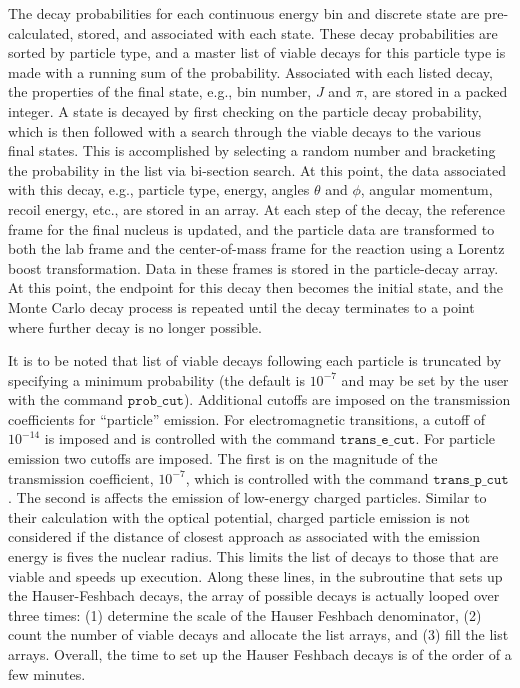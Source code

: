 \documentclass[
10pt,
showpacs,preprintnumbers,footinbib,
amsfonts,amsmath,amssymb,
aps,
prc,twocolumn,groupedaddress,superscriptaddress,
showkeys,
nofootinbib
]{revtex4-1}
\begin{document}
The decay probabilities for each continuous energy bin and discrete state are pre-calculated, stored, and associated with each state. These decay probabilities are sorted by particle type, and a master list of viable decays for this particle type is made with a running sum of the probability. Associated with each listed decay, the properties of the final state, e.g., bin number, $J$ and $\pi$, are stored in a packed integer. A state is decayed by first checking on the particle decay probability, which is then followed with a search through the viable decays to the various final states. This is accomplished by selecting a random number and bracketing the probability in the list via bi-section search. At this point, the data associated with this decay, e.g., particle type, energy, angles $\theta$ and $\phi$, angular momentum, recoil energy, etc., are stored in an array. At each step of the decay, the reference frame for the final nucleus is updated, and the particle data are transformed to both the lab frame and the center-of-mass frame for the reaction using a Lorentz boost transformation. Data in these frames is stored in the particle-decay array. At this point, the endpoint for this decay then becomes the initial state, and the Monte Carlo decay process is repeated until the decay terminates to a point where further decay is no longer possible. 

It is to be noted that list of viable decays following each particle is truncated by specifying a minimum probability (the default is $10^{-7}$ and may be set by the user with the command ${\texttt{prob\_cut}}$). Additional cutoffs are imposed on the transmission coefficients for ``particle'' emission. For electromagnetic transitions, a cutoff of $10^{-14}$ is imposed and is controlled with the command ${\texttt{trans\_e\_cut}}$. For particle emission two cutoffs are imposed. The first is on the magnitude of the transmission coefficient, $10^{-7}$, which is controlled with the command ${\texttt{trans\_p\_cut}}$. The second is affects the emission of low-energy charged particles. Similar to their calculation with the optical potential, charged particle emission is not considered if the distance of closest approach as associated with the emission energy is fives the nuclear radius. This limits the list of decays to those that are viable and speeds up execution. Along these lines, in the subroutine that sets up the Hauser-Feshbach decays, the array of possible decays is actually looped over three times: (1) determine the scale of the Hauser Feshbach denominator, (2) count the number of viable decays and allocate the list arrays, and (3) fill the list arrays. Overall, the time to set up the Hauser Feshbach decays is of the order of a few minutes.
\end{document}
